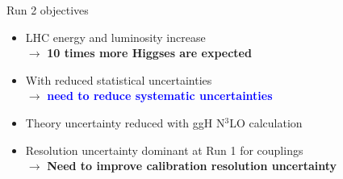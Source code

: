 \begin{frame}{Run 2 objectives}
  \begin{minipage}{0.49\linewidth}
  \begin{itemize}
  \item LHC energy and luminosity increase \\
    $\rightarrow$ {\bf 10 times more Higgses are expected}
  \item With reduced statistical uncertainties \\ $\rightarrow$ \textcolor{blue}{\bf need to reduce systematic uncertainties}
  \item Theory uncertainty reduced with ggH N$^3$LO calculation
  \item Resolution uncertainty dominant at Run 1 for couplings \\
    $\rightarrow$ {\bf Need to improve calibration resolution uncertainty}
  \end{itemize}
  \end{minipage}
  \hfill
  \begin{minipage}{0.49\linewidth}
    \centering
  \end{minipage}
\end{frame}
